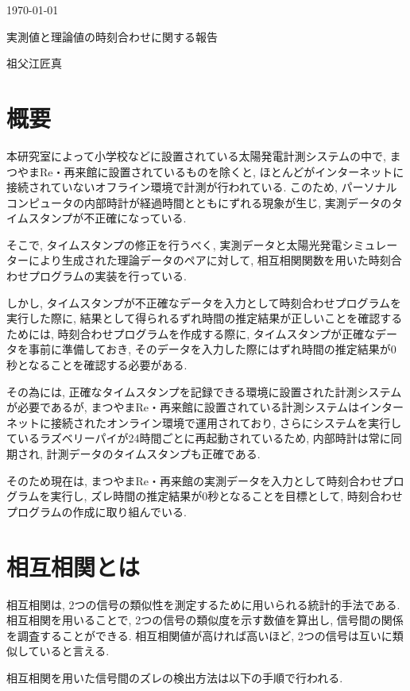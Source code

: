 \documentclass[a4j,12pt,]{jarticle}
\begin{document}
{\noindent\small  \hfill\today}
\begin{center}
  {\Large 実測値と理論値の時刻合わせに関する報告}
\end{center}
\begin{flushright}
  祖父江匠真 \\
\end{flushright}

\section{概要}
本研究室によって小学校などに設置されている太陽発電計測システムの中で, まつやまRe・再来館に設置されているものを除くと, ほとんどがインターネットに接続されていないオフライン環境で計測が行われている. このため, パーソナルコンピュータの内部時計が経過時間とともにずれる現象が生じ, 実測データのタイムスタンプが不正確になっている. 

そこで, タイムスタンプの修正を行うべく, 実測データと太陽光発電シミュレーターにより生成された理論データのペアに対して, 相互相関関数を用いた時刻合わせプログラムの実装を行っている. 

しかし, タイムスタンプが不正確なデータを入力として時刻合わせプログラムを実行した際に, 結果として得られるずれ時間の推定結果が正しいことを確認するためには, 時刻合わせプログラムを作成する際に, タイムスタンプが正確なデータを事前に準備しておき, そのデータを入力した際にはずれ時間の推定結果が0秒となることを確認する必要がある. 

その為には, 正確なタイムスタンプを記録できる環境に設置された計測システムが必要であるが, まつやまRe・再来館に設置されている計測システムはインターネットに接続されたオンライン環境で運用されており, さらにシステムを実行しているラズベリーパイが24時間ごとに再起動されているため, 内部時計は常に同期され, 計測データのタイムスタンプも正確である. 

そのため現在は, まつやまRe・再来館の実測データを入力として時刻合わせプログラムを実行し, ズレ時間の推定結果が0秒となることを目標として, 時刻合わせプログラムの作成に取り組んでいる. 

\section{相互相関とは}
相互相関は, 2つの信号の類似性を測定するために用いられる統計的手法である. 相互相関を用いることで, 2つの信号の類似度を示す数値を算出し, 信号間の関係を調査することができる. 相互相関値が高ければ高いほど, 2つの信号は互いに類似していると言える. 

相互相関を用いた信号間のズレの検出方法は以下の手順で行われる. 
\end{document}
